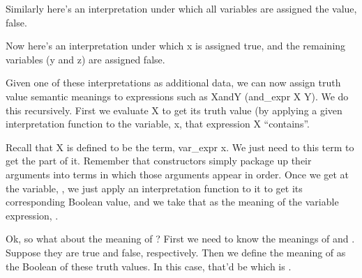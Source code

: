 \documentclass[letterpaper,10pt,english]{sphinxmanual}
\begin{document}
\sphinxAtStartPar
Similarly here’s an interpretation under which all variables
are assigned the value, false.

\begin{sphinxVerbatim}[commandchars=\\\{\}]
     
      
\end{sphinxVerbatim}

\sphinxAtStartPar
Now here’s an interpretation under which x is assigned true,
and the remaining variables (y and z) are assigned false.

\begin{sphinxVerbatim}[commandchars=\\\{\}]
     
   
   

  

     
   
   
   
\end{sphinxVerbatim}

\sphinxAtStartPar
Given one of these interpretations as additional data, we
can now assign truth value semantic meanings to expressions
such as XandY (and\_expr X Y). We do this recursively. First
we evaluate X to get its truth value (by applying a given
interpretation function to the variable, x, that expression
X “contains”.

\sphinxAtStartPar
Recall that X is defined to be the term, var\_expr x. We just
need to  this term to get the  part of it.
Remember that constructors simply package up their arguments
into terms in which those arguments appear in order. Once we
get at the variable, , we just apply an interpretation
function to it to get its corresponding Boolean value, and
we take that as the meaning of the variable expression, .

\sphinxAtStartPar
Ok, so what about the meaning of ? First we
need to know the meanings of  and . Suppose they are
true and false, respectively. Then we define the meaning of
 as the Boolean  of these truth
values. In this case, that’d be  which is .
\end{document}
